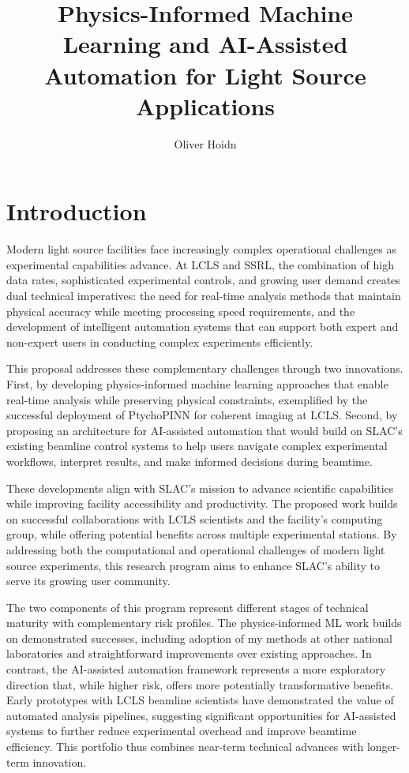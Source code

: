 \documentclass{article}
\title{Physics-Informed Machine Learning and AI-Assisted Automation for Light Source Applications}
\author{Oliver Hoidn} %
\date{}
\begin{document}
\maketitle

\section*{Introduction}
Modern light source facilities face increasingly complex operational challenges as experimental capabilities advance. At LCLS and SSRL, the combination of high data rates, sophisticated experimental controls, and growing user demand creates dual technical imperatives: the need for real-time analysis methods that maintain physical accuracy while meeting processing speed requirements, and the development of intelligent automation systems that can support both expert and non-expert users in conducting complex experiments efficiently.

This proposal addresses these complementary challenges through two innovations. First, by developing physics-informed machine learning approaches that enable real-time analysis while preserving physical constraints, exemplified by the successful deployment of PtychoPINN for coherent imaging at LCLS. Second, by proposing an architecture for AI-assisted automation that would build on SLAC's existing beamline control systems to help users navigate complex experimental workflows, interpret results, and make informed decisions during beamtime.

These developments align with SLAC's mission to advance scientific capabilities while improving facility accessibility and productivity. The proposed work builds on successful collaborations with LCLS scientists and the facility's computing group, while offering potential benefits across multiple experimental stations. By addressing both the computational and operational challenges of modern light source experiments, this research program aims to enhance SLAC's ability to serve its growing user community.

The two components of this program represent different stages of technical maturity with complementary risk profiles. The physics-informed ML work builds on demonstrated successes, including adoption of my methods at other national laboratories and straightforward improvements over existing approaches. In contrast, the AI-assisted automation framework represents a more exploratory direction that, while higher risk, offers more potentially transformative benefits. Early prototypes with LCLS beamline scientists have demonstrated the value of automated analysis pipelines, suggesting significant opportunities for AI-assisted systems to further reduce experimental overhead and improve beamtime efficiency. This portfolio thus combines near-term technical advances with longer-term innovation.
\end{document}
